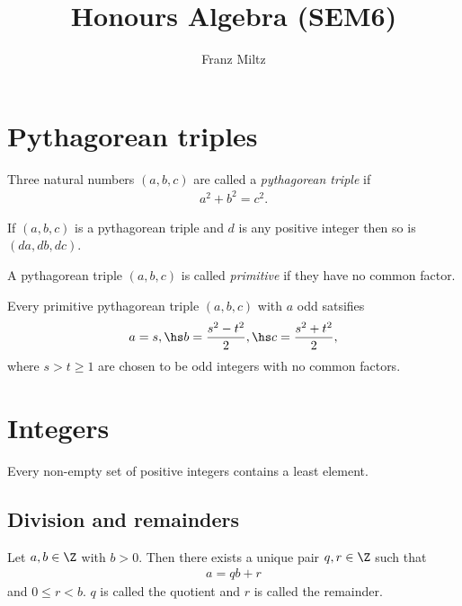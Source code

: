 \documentclass{article}
\begin{document}
\mkthmstwounified
\title{Honours Algebra (SEM6)}
\author{Franz Miltz}
\maketitle
\tableofcontents
\pagebreak

\section{Pythagorean triples}

\begin{definition}
    Three natural numbers $(a,b,c)$ are called a \emph{pythagorean triple} if
    \begin{align*}
        a^2 + b^2 = c^2.
    \end{align*}
\end{definition}

\begin{lemma}
    If $(a,b,c)$ is a pythagorean triple and $d$ is any positive integer then
    so is $(da,db,dc)$.
\end{lemma}

\begin{definition}
    A pythagorean triple $(a,b,c)$ is called \emph{primitive} if they have no common factor.
\end{definition}

\begin{theorem}
    Every primitive pythagorean triple $(a,b,c)$ with $a$ odd satsifies
    \begin{align*}
        a=s,\hs b=\frac{s^2-t^2}{2},\hs c=\frac{s^2+t^2}{2},
    \end{align*}
    where $s>t\geq 1$ are chosen to be odd integers with no common factors.
\end{theorem}

\section{Integers}

\begin{theorem}
    Every non-empty set of positive integers contains a least element.
\end{theorem}

\subsection{Division and remainders}

\begin{theorem}
    Let $a,b\in\Z$ with $b>0$. Then there exists a unique pair $q,r\in\Z$ such that
    \begin{align*}
        a = qb + r
    \end{align*}
    and $0\leq r<b$. $q$ is called the quotient and $r$ is called the remainder.
\end{theorem}
\end{document}
